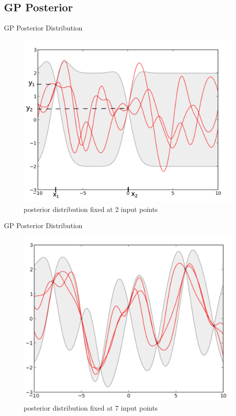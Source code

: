 \documentclass[xcolor=x11names,compress]{beamer}
\begin{document}
    \subsection{GP Posterior}
    \begin{frame}{GP Posterior Distribution}
\begin{figure}
\centering
\includegraphics[width=.6\textwidth]{../resources/figures/gp_posterior_2.pdf}
\caption{posterior distribution fixed at 2 input points}
\end{figure}
    \end{frame}

\begin{frame}{GP Posterior Distribution}
\begin{figure}
\centering
\includegraphics[width=.6\textwidth]{../resources/figures/gp_posterior.pdf}
\caption{posterior distribution fixed at 7 input points}
\end{figure}
\end{frame}

\end{document}
